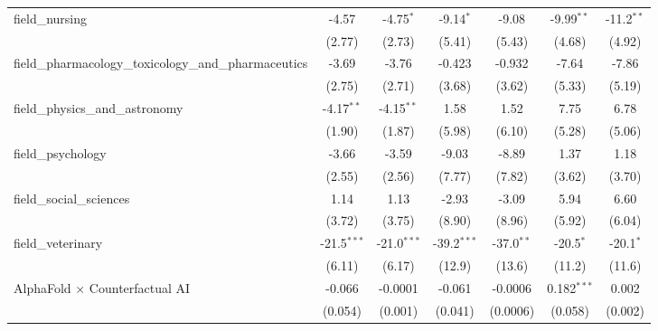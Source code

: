 \begin{tabular}{lcccccc}
   field\_nursing                                              & -4.57          & -4.75$^{*}$    & -9.14$^{*}$   & -9.08         & -9.99$^{**}$  & -11.2$^{**}$\\   
                                                               & (2.77)         & (2.73)         & (5.41)        & (5.43)        & (4.68)        & (4.92)\\   
   field\_pharmacology\_toxicology\_and\_pharmaceutics         & -3.69          & -3.76          & -0.423        & -0.932        & -7.64         & -7.86\\   
                                                               & (2.75)         & (2.71)         & (3.68)        & (3.62)        & (5.33)        & (5.19)\\   
   field\_physics\_and\_astronomy                              & -4.17$^{**}$   & -4.15$^{**}$   & 1.58          & 1.52          & 7.75          & 6.78\\   
                                                               & (1.90)         & (1.87)         & (5.98)        & (6.10)        & (5.28)        & (5.06)\\   
   field\_psychology                                           & -3.66          & -3.59          & -9.03         & -8.89         & 1.37          & 1.18\\   
                                                               & (2.55)         & (2.56)         & (7.77)        & (7.82)        & (3.62)        & (3.70)\\   
   field\_social\_sciences                                     & 1.14           & 1.13           & -2.93         & -3.09         & 5.94          & 6.60\\   
                                                               & (3.72)         & (3.75)         & (8.90)        & (8.96)        & (5.92)        & (6.04)\\   
   field\_veterinary                                           & -21.5$^{***}$  & -21.0$^{***}$  & -39.2$^{***}$ & -37.0$^{**}$  & -20.5$^{*}$   & -20.1$^{*}$\\   
                                                               & (6.11)         & (6.17)         & (12.9)        & (13.6)        & (11.2)        & (11.6)\\   
   AlphaFold $\times$ Counterfactual AI                        & -0.066         & -0.0001        & -0.061        & -0.0006       & 0.182$^{***}$ & 0.002\\   
                                                               & (0.054)        & (0.001)        & (0.041)       & (0.0006)      & (0.058)       & (0.002)\\   

\end{tabular}
